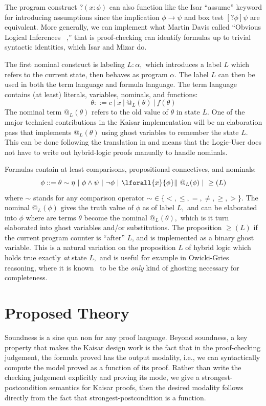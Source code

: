 \documentclass[12pt]{cmuthesis}
\theoremstyle{definition}
\theoremstyle{remark}
\begin{document}
The program construct $?(x:\phi)$ can also function like the Isar ``assume'' keyword for introducing assumptions since  the implication $\phi \rightarrow \psi$ and box test $[?\phi]\psi$ are equivalent.
More generally, we can implement what Martin Davis called ``Obvious Logical Inferences~\cite{DBLP:conf/ijcai/Davis81} ,''
 that is proof-checking can identify formulas up to trivial syntactic identities, which Isar and Mizar do.

The first nominal construct is labeling $L: \alpha,$ which introduces a label $L$ which refers to the current state, then behaves as program $\alpha$.
The label $L$ can then be used in both the term language and formula language.
The term language contains (at least) literals, variables, nominals, and functions:
\[\theta ::= c\ |\ x\ |\ @_L(\theta)\ |\ f(\theta)\]
The nominal term $@_L(\theta)$ refers to the old value of $\theta$ in state $L$.
One of the major technical contributions in the Kaisar implementation will be an elaboration pass that implements $@_L(\theta)$ using ghost variables to remember the state $L$.
This can be done following the translation in \cite{DBLP:conf/lics/BohrerP18} and means that the Logic-User does not have to write out hybrid-logic proofs manually to handle nominals.

\newcommand{\eafter}[1]{\geq(#1)}
Formulas contain at least comparisons, propositional connectives, and nominals:
\[\phi ::=  \theta \sim \eta\ |\ \phi \land \psi\ |\ \neg \phi\ |\ \lforall{x}{\phi}\|\ @_L(\phi)\ |\ \eafter{L}\]
where $\sim$ stands for any comparison operator $\sim \in \{<,\leq,=,\neq,\geq,>\}$.
The nominal $@_L(\phi)$ gives the truth value of $\phi$ as of label $L,$ and can be elaborated into $\phi$ where are terms $\theta$ become the nominal $@_L(\theta),$ which is it turn elaborated into ghost variables and/or substitutions.
The proposition $\eafter{L}$ if the current program counter is ``after'' $L$, and is implemented as a binary ghost variable.
This is a natural variation on the proposition $L$ of hybrid logic which holds true exactly \emph{at} state $L,$ and is useful for example in Owicki-Gries reasoning, where it is known~\cite{DBLP:journals/tse/Lamport77} to be the \emph{only} kind of ghosting necessary for completeness.


\section{Proposed Theory}
Soundness is a sine qua non for any proof language.
Beyond soundness, a key property that makes the Kaisar design work is the fact that in the proof-checking judgement, the formula proved has the output modality, i.e., we can syntactically compute the model proved as a function of its proof.
Rather than write the checking judgement explicitly and proving its mode, we give a strongest-postcondition semantics for Kaisar proofs, then the desired modality follows directly from the fact that strongest-postcondition is a function.
\end{document}

